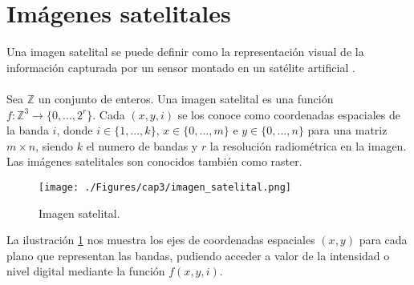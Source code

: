 \section{Im\'agenes satelitales}
Una imagen satelital se puede definir como la representaci\'on visual de la informaci\'on capturada por un sensor montado en un sat\'elite artificial \cite{acosta2003experiencia}. \\~\\
Sea $ \mathbb{Z} $ un conjunto de enteros. Una imagen satelital es una funci\'on $ f:\mathbb{Z}^{3} \longrightarrow \{0,...,2^{r}\} $. Cada $ (x,y,i) $ se los conoce como coordenadas espaciales de la banda $ i $, donde $ i \in \{1,...,k\} $, $ x \in \{0,...,m\} $ e $ y \in \{0,...,n\} $ para una matriz $ m \times n $, siendo $ k $ el numero de bandas y $ r $ la resoluci\'on radiom\'etrica en la imagen. Las im\'agenes satelitales son conocidos tambi\'en como raster.
  \begin{figure}[H]
  	\centering
  	\texttt{[image: ./Figures/cap3/imagen\_satelital.png]}
  	\caption{Imagen satelital.}
  	\label{fig:imagenMultiespectral}
  \end{figure}
La ilustraci\'on \ref{fig:imagenMultiespectral} nos muestra los ejes de coordenadas espaciales $ (x,y) $ para cada plano que representan las bandas, pudiendo acceder a valor de la intensidad o nivel digital mediante la funci\'on $ f(x,y,i) $.


